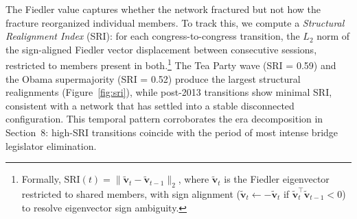 \documentclass[12pt, a4paper]{article}
\begin{document}
The Fiedler value captures whether the network fractured but not how the fracture reorganized individual members. To track this, we compute a \textit{Structural Realignment Index} (SRI): for each congress-to-congress transition, the $L_2$ norm of the sign-aligned Fiedler vector displacement between consecutive sessions, restricted to members present in both.\footnote{Formally, $\text{SRI}(t) = \| \tilde{\mathbf{v}}_{t} - \tilde{\mathbf{v}}_{t-1} \|_2$, where $\tilde{\mathbf{v}}_t$ is the Fiedler eigenvector restricted to shared members, with sign alignment ($\tilde{\mathbf{v}}_t \leftarrow -\tilde{\mathbf{v}}_t$ if $\tilde{\mathbf{v}}_{t}^\top \tilde{\mathbf{v}}_{t-1} < 0$) to resolve eigenvector sign ambiguity.} The Tea Party wave (SRI = 0.59) and the Obama supermajority (SRI = 0.52) produce the largest structural realignments (Figure~\ref{fig:sri}), while post-2013 transitions show minimal SRI, consistent with a network that has settled into a stable disconnected configuration. This temporal pattern corroborates the era decomposition in Section~8: high-SRI transitions coincide with the period of most intense bridge legislator elimination.
\end{document}
